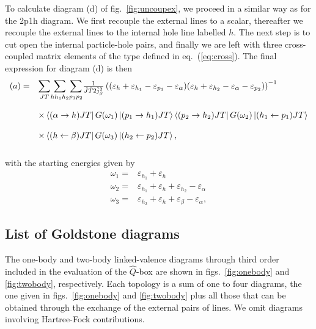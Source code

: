 To calculate diagram (d) of fig.\ \ref{fig:uncoupex}, we proceed in 
a similar way as for the 2p1h diagram. 
We first recouple the external lines 
to a scalar, thereafter we recouple the
external lines to the internal hole line labelled $h$. The next step
is to cut open the internal particle-hole pairs, and finally 
we are left with three cross-coupled matrix elements of the type defined in 
eq.\ (\ref{eq:cross}). 
The final expression for diagram (d) is then
\begin{equation}
\begin{array}{ll}
(a)=&{\displaystyle\sum_{JT}}
{\displaystyle\sum_{hh_{1}h_{2}}}
{\displaystyle\sum_{p_{1}p_{2}}}
\frac{1}{\hat{J}\hat{T}2\hat{j}_{\beta}^2}
\left((\varepsilon_{h}+\varepsilon_{h_{1}}-
\varepsilon_{p_{1}}-\varepsilon_{\alpha})(\varepsilon_{h}+
\varepsilon_{h_{2}}-\varepsilon_{\alpha}-
\varepsilon_{p_{2}})\right)^{-1}\\
&\\
&\times\left\langle (\alpha\rightarrow h)JT \right|G(\omega_{1})
       \left| (p_1\rightarrow h_1)JT \right\rangle
       \left\langle (p_{2}\rightarrow h_{2})JT \right|G(\omega_{2})
       \left| (h_{1}\leftarrow p_{1})JT \right\rangle \\
&\\
&\times
       \left\langle (h\leftarrow \beta)JT \right|G(\omega_{3})
       \left| (h_2\leftarrow p_{2})JT \right\rangle,\\
&\\
\end{array}
\end{equation}
with the starting energies given by
\[
\begin{array}{ll}
\omega_{1}=&\varepsilon_{h_{1}}+\varepsilon_{h}\\
\omega_{2}=&\varepsilon_{h_{1}}+\varepsilon_{h}+
\varepsilon_{h_{2}}-\varepsilon_{\alpha}\\
\omega_{3}=&\varepsilon_{h_{2}}+\varepsilon_{h}+
\varepsilon_{\beta}-\varepsilon_{\alpha},
\end{array}
\]




\subsection{List of Goldstone diagrams}

The one-body and two-body linked-valence diagrams through third
order included in the evaluation of
the $\hat{Q}$-box are shown in
figs.\ \ref{fig:onebody} and \ref{fig:twobody}, respectively.
Each topology is a sum of one to four diagrams, the one given in
figs.\ \ref{fig:onebody}  and  \ref{fig:twobody}
plus all those that can be obtained through the
exchange of the external pairs of lines. 
We omit
diagrams involving Hartree-Fock contributions.

